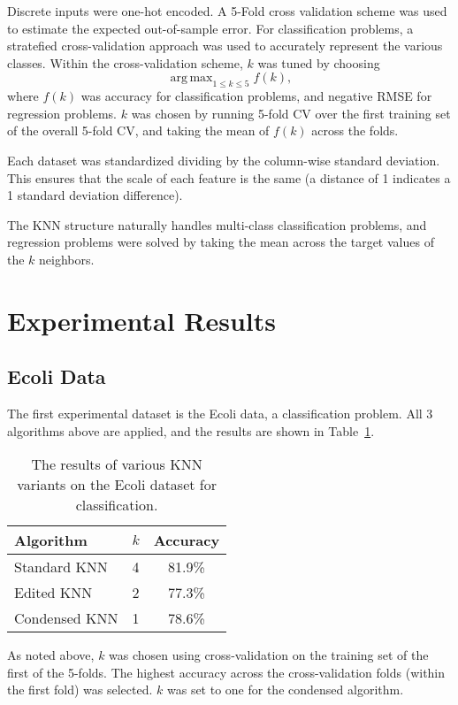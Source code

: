 \documentclass{amsart}
\DeclareMathOperator*{\argmax}{arg\,max}
\begin{document}
    Discrete inputs were one-hot encoded. A 5-Fold cross validation scheme was used to estimate the expected out-of-sample
    error. For classification problems, a stratefied cross-validation approach was used to accurately
    represent the various classes. Within the cross-validation scheme, $k$ was tuned by choosing
    \[
        \argmax_{1 \leq k \leq 5} f(k),
    \]
    where $f(k)$ was accuracy for classification problems, and negative RMSE for regression problems. $k$ was chosen
    by running 5-fold CV over the first training set of the overall 5-fold CV, and taking the mean of $f(k)$ across the
    folds.

    Each dataset was standardized dividing by the column-wise standard deviation. This
    ensures that the scale of each feature is the same (a distance of 1 indicates a 1
    standard deviation difference).

    The KNN structure naturally handles multi-class classification problems, and regression
    problems were solved by taking the mean across the target values of the $k$ neighbors.

    \section{Experimental Results}
    \subsection*{Ecoli Data}
    The first experimental dataset is the Ecoli data\cite{ecoli_dataset},
    a classification problem. All 3 algorithms above are applied,
    and the results are shown in Table~\ref{ecoli_results}.

    \begin{table}[H]
    \begin{tabular}{lcc}
        Algorithm     & $k$ & Accuracy \\
        \hline
        Standard KNN  & 4 & 81.9\% \\
        Edited KNN    & 2 & 77.3\% \\
        Condensed KNN & 1 & 78.6\% \\
    \end{tabular}
    \label{ecoli_results}
    \caption{The results of various KNN variants on the Ecoli dataset for classification.}
    \end{table}
    As noted above, $k$ was chosen using cross-validation on the training set of the first of the 5-folds. The highest
    accuracy across the cross-validation folds (within the first fold) was selected. $k$ was set to one for the
    condensed algorithm.
\end{document}

